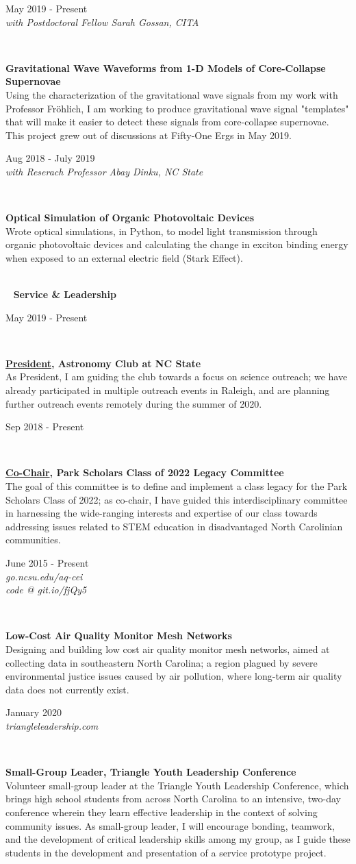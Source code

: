 \documentclass[8pt]{article}
\def \primarycolor   {spacecadet}
\def \tertiarycolor  {airforceblue} %
\def \titlerectmin{0.15cm}
\def \titlerectmax{0.35cm}
\def \leftcolwidth{3.05cm}
\newcommand{\cvheader}[1]{
    \tikz{\fill [\primarycolor] (0,\titlerectmin) rectangle (\leftcolwidth,\titlerectmax);} \ 
    \textcolor{\primarycolor}{ \large{\textbf{#1}} } 
}
\newcommand{\cventry}[4]{
    \begin{minipage}[t]{\leftcolwidth} 
        \small{
            \begin{flushright}
                #2\\
                \textcolor{\tertiarycolor}{\textit{#4}}
            \end{flushright}
        }
    \end{minipage} \ \
    \begin{minipage}[t]{\linewidth-\leftcolwidth} \normalsize{\textbf{#1} \\ #3} \end{minipage}
} %
\begin{document}
\cventry{Gravitational Wave Waveforms from 1-D Models of Core-Collapse Supernovae}{May 2019 - Present}
{Using the characterization of the gravitational wave signals from my work with Professor Fr\"ohlich, I am working to produce gravitational wave signal "templates" that will make it easier to detect these signals from core-collapse supernovae. This project grew out of discussions at Fifty-One Ergs in May 2019.}{with Postdoctoral Fellow Sarah Gossan, CITA}

\cventry{Optical Simulation of Organic Photovoltaic Devices}{Aug 2018 - July 2019}{
Wrote optical simulations, in Python, to model light transmission through organic photovoltaic devices and calculating the change in exciton binding energy when exposed to an external electric field (Stark Effect).
}{with Reserach Professor Abay Dinku, NC State}
\\
\cvheader{Service \& Leadership}

\cventry{\underline{President}, Astronomy Club at NC State}{May 2019 - Present}{As President, I am guiding the club towards a focus on science outreach; we have already participated in multiple outreach events in Raleigh, and are planning further outreach events remotely during the summer of 2020.}{}

\cventry{\underline{Co-Chair}, Park Scholars Class of 2022 Legacy Committee}{Sep 2018 - Present}{The goal of this committee is to define and implement a class legacy for the Park Scholars Class of 2022; as co-chair, I have guided this interdisciplinary committee in harnessing the wide-ranging interests and expertise of our class towards addressing issues related to STEM education in disadvantaged North Carolinian communities.}{}

\cventry{Low-Cost Air Quality Monitor Mesh Networks}{June 2015 - Present}{Designing and building low cost air quality monitor mesh networks, aimed at collecting data in southeastern North Carolina; a region plagued by severe environmental justice issues caused by air pollution, where long-term air quality data does not currently exist.
}{go.ncsu.edu/aq-cei \\ code @ git.io/fjQy5}

\cventry{Small-Group Leader, Triangle Youth Leadership Conference}{January 2020}{Volunteer small-group leader at the Triangle Youth Leadership Conference, which brings high school students from across North Carolina to an intensive, two-day conference wherein they learn effective leadership in the context of solving community issues. As small-group leader, I will encourage bonding, teamwork, and the development of critical leadership skills among my group, as I guide these students in the development and presentation of a service prototype project.
}
{triangleleadership.com}
\end{document}
